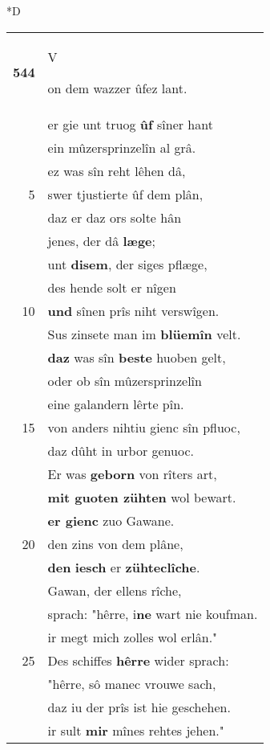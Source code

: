 \documentclass[8pt,a4paper,notitlepage]{article}
\begin{document}
\begin{table}[ht]
\begin{minipage}[t]{0.5\linewidth}
\small
\begin{center}*D
\end{center}
\begin{tabular}{rl}
\textbf{544} & \begin{large}V\end{large}on dem wazzer ûfez lant.\\ 
 & er gie unt truog \textbf{ûf} sîner hant\\ 
 & ein mûzersprinzelîn al grâ.\\ 
 & ez was sîn reht lêhen dâ,\\ 
5 & swer tjustierte ûf dem plân,\\ 
 & daz er daz ors solte hân\\ 
 & jenes, der dâ \textbf{læge};\\ 
 & unt \textbf{disem}, der siges pflæge,\\ 
 & des hende solt er nîgen\\ 
10 & \textbf{und} sînen prîs niht verswîgen.\\ 
 & Sus zinsete man im \textbf{blüemîn} velt.\\ 
 & \textbf{daz} was sîn \textbf{beste} huoben gelt,\\ 
 & oder ob sîn mûzersprinzelîn\\ 
 & eine galandern lêrte pîn.\\ 
15 & von anders nihtiu gienc sîn pfluoc,\\ 
 & daz dûht in urbor genuoc.\\ 
 & Er was \textbf{geborn} von rîters art,\\ 
 & \textbf{mit guoten zühten} wol bewart.\\ 
 & \textbf{er gienc} zuo Gawane.\\ 
20 & den zins von dem plâne,\\ 
 & \textbf{den} \textbf{iesch} er \textbf{zühteclîche}.\\ 
 & Gawan, der ellens rîche,\\ 
 & sprach: "hêrre, i\textbf{ne} wart nie koufman.\\ 
 & ir megt mich zolles wol erlân."\\ 
25 & Des schiffes \textbf{hêrre} wider sprach:\\ 
 & "hêrre, sô manec vrouwe sach,\\ 
 & daz iu der prîs ist hie geschehen.\\ 
 & ir sult \textbf{mir} mînes rehtes jehen."\\ 

\end{tabular}
\end{minipage}
\end{table}
\end{document}
